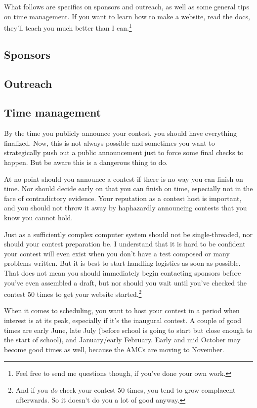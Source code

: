 \documentclass[points=false]{bounce}
\begin{document}
What follows are specifics on sponsors and outreach, as well as some general tips on time management. If you want to learn how to make a website, read the docs, they'll teach you much better than I can.\footnote{Feel free to send me questions though, if you've done your own work.}

\subsection{Sponsors}

\subsection{Outreach}



\subsection{Time management}

By the time you publicly announce your contest, you should have everything finalized. Now, this is not always possible and sometimes you want to strategically push out a public announcement just to force some final checks to happen. But be aware this is a dangerous thing to do.

At no point should you announce a contest if there is no way you can finish on time.
Nor should decide early on that you can finish on time, especially not in the face of contradictory evidence.
Your reputation as a contest host is important,
and you should not throw it away by haphazardly announcing contests that you know you cannot hold.

Just as a sufficiently complex computer system should not be single-threaded, nor should your contest preparation be. I understand that it is hard to be confident your contest will even exist when you don't have a test composed or many problems written. But it is best to start handling logistics as soon as possible. That does not mean you should immediately begin contacting sponsors before you've even assembled a draft, but nor should you wait until you've checked the contest $50$ times to get your website started.\footnote{And if you \emph{do} check your contest $50$ times, you tend to grow complacent afterwards. So it doesn't do you a lot of good anyway.}

When it comes to scheduling, you want to host your contest in a period when interest is at its peak, especially if it's the inaugural contest. A couple of good times are early June, late July (before school is going to start but close enough to the start of school), and January/early February. Early and mid October may become good times as well, because the AMCs are moving to November. 
\end{document}
